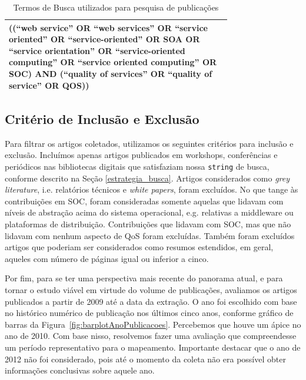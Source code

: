 \begin{table}[ht]
\centering
\caption{Termos de Busca utilizados para pesquisa de publicações}
\label{tab:exTable1}
\begin{tabular}{p{0.75\linewidth}}
\hline
((``web service'' OR ``web services'' OR ``service oriented'' OR ``service-oriented'' OR SOA OR ``service orientation'' OR ``service-oriented computing'' OR ``service oriented computing'' OR SOC) AND (``quality of services'' OR ``quality of service'' OR QOS)) \\
\hline
\end{tabular}
\end{table}


\subsection{Crit\'{e}rio de Inclusão e Exclusão}

Para filtrar os artigos coletados, utilizamos os seguintes critérios para inclus\~{a}o e exclus\~{a}o. Inclu\'{i}mos apenas artigos publicados em workshops, confer\^{e}ncias e peri\'{o}dicos nas bibliotecas digitais que satisfaziam nossa \texttt{string} de busca, conforme descrito na Se\c{c}\~{a}o \ref{estrategia_busca}. Artigos considerados como \emph{grey literature}, i.e. relat\'{o}rios t\'{e}cnicos e \emph{white papers}, foram exclu\'{i}dos. No que tange \`{a}s contribui\c{c}\~{o}es em SOC, foram consideradas somente aquelas que lidavam com n\'{i}veis de abstra\c{c}\~{a}o acima do sistema operacional, e.g. relativas a middleware ou plataformas de distribui\c{c}\~{a}o. Contribui\c{c}\~{o}es que lidavam com SOC, mas que n\~{a}o lidavam com nenhum aspecto de QoS foram exclu\'{i}das. Tamb\'{e}m foram exclu\'{i}dos artigos que poderiam ser considerados como resumos estendidos, em geral, aqueles com n\'{u}mero de p\'{a}ginas igual ou inferior a cinco. 

Por fim, para se ter uma perspectiva mais recente do panorama atual, e para tornar o estudo vi\'{a}vel em virtude do volume de publica\c{c}\~{o}es, avaliamos os artigos publicados a partir de 2009 at\'{e} a data da extra\c{c}\~{a}o. O ano foi escolhido com base no hist\'{o}rico num\'{e}rico de publica\c{c}\~{a}o nos \'{u}ltimos cinco anos, conforme gr\'{a}fico de barras da  Figura~\ref{fig:barplotAnoPublicacoes}. Percebemos que houve um \'{a}pice no ano de 2010. Com base nisso, resolvemos fazer uma avalia\c{c}\~{a}o que compreendesse um per\'{i}odo representativo para o mapeamento. Importante destacar que o ano de 2012 n\~{a}o foi considerado, pois at\'{e} o momento da coleta n\~{a}o era poss\'{i}vel obter informa\c{c}\~{o}es conclusivas sobre aquele ano.

